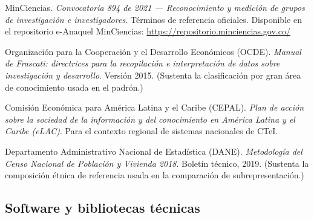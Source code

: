 \documentclass[11pt,a4paper,oneside]{article}
\begin{document}
\begin{enumerate}[label={[}\arabic*{]},start=7,leftmargin=2.2em,itemsep=4pt]
\item MinCiencias. \emph{Convocatoria 894 de 2021 --- Reconocimiento y medición de grupos de investigación e investigadores}. Términos de referencia oficiales. Disponible en el repositorio e-Anaquel MinCiencias: \url{https://repositorio.minciencias.gov.co/}

\item Organización para la Cooperación y el Desarrollo Económicos (OCDE). \emph{Manual de Frascati: directrices para la recopilación e interpretación de datos sobre investigación y desarrollo}. Versión 2015. (Sustenta la clasificación por gran área de conocimiento usada en el padrón.)

\item Comisión Económica para América Latina y el Caribe (CEPAL). \emph{Plan de acción sobre la sociedad de la información y del conocimiento en América Latina y el Caribe (eLAC)}. Para el contexto regional de sistemas nacionales de CTeI.

\item Departamento Administrativo Nacional de Estadística (DANE). \emph{Metodología del Censo Nacional de Población y Vivienda 2018}. Boletín técnico, 2019. (Sustenta la composición étnica de referencia usada en la comparación de subrepresentación.)
\end{enumerate}

\subsection*{Software y bibliotecas técnicas}
\end{document}
